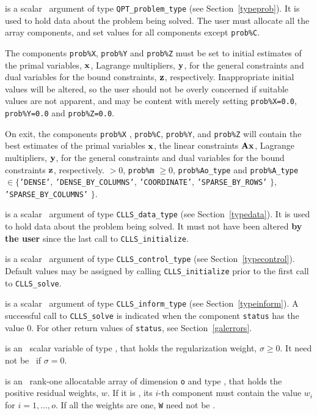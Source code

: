 \documentclass{galahad}
\newcommand{\packagename}{CLLS}
\begin{document}
\begin{description}
 is a scalar \intentinout\ argument of type
{\tt QPT\_problem\_type}
(see Section~\ref{typeprob}).
It is used to hold data about the problem being solved.
The user must allocate all the array components,
and set values for all components except {\tt prob\%C}.

The components {\tt prob\%X}, {\tt prob\%Y} and {\tt prob\%Z}
must be set to initial estimates of the primal variables, ${\mathbf{x}}$,
Lagrange multipliers, ${\mathbf{y}}$, for the general constraints
and dual variables for the bound constraints, ${\mathbf{z}}$, respectively.
Inappropriate initial values will be altered, so the user should
not be overly concerned if suitable values are not apparent, and may be
content with merely setting {\tt prob\%X=0.0}, {\tt prob\%Y=0.0}
and {\tt prob\%Z=0.0}.

On exit, the components {\tt prob\%X} , {\tt prob\%C}, {\tt prob\%Y},
and {\tt prob\%Z}
will contain the best estimates of the primal variables ${\mathbf{x}}$,
the linear constraints ${\mathbf{A}} {\mathbf{x}}$,
Lagrange multipliers, ${\mathbf{y}}$, for the general constraints
and dual variables for the bound constraints ${\mathbf{z}}$, respectively.
 $> 0$, {\tt prob\%m} $\geq 0$,
 {\tt prob\%Ao\_type} and {\tt prob\%A\_type} $\in \{${\tt 'DENSE'},
 {\tt 'DENSE\_BY\_COLUMNS'},
 {\tt 'COORDINATE'}, {\tt 'SPARSE\_BY\_\-ROWS'} $\}$,
 {\tt 'SPARSE\_BY\_\-COLUMNS'} $\}$.

 is a scalar \intentinout\ argument of type
{\tt \packagename\_data\_type}
(see Section~\ref{typedata}). It is used to hold data about the problem being
solved. It must not have been altered {\bf by the user} since the last call to
{\tt \packagename\_initialize}.

 is a scalar \intentin\ argument of type
{\tt \packagename\_control\_type}
(see Section~\ref{typecontrol}). Default values may be assigned by calling
{\tt \packagename\_initialize} prior to the first call to
{\tt \packagename\_solve}.

 is a scalar \intentinout\ argument of type
{\tt \packagename\_inform\_type}
(see Section~\ref{typeinform}).
A successful call to
{\tt \packagename\_solve}
is indicated when the  component {\tt status} has the value 0.
For other return values of {\tt status}, see Section~\ref{galerrors}.

 is an \optional\ scalar variable of type
\realdp, that holds the regularization weight, $\sigma \geq 0$.
It need not be \present\ if $\sigma = 0$.

 is an \optional\ rank-one allocatable array of dimension {\tt o} and
type \realdp, that holds the positive residual weights, $w$. If it
is \present, its $i$-th component must contain the value $w_{i}$ for
$i = 1, \ldots , o$.
If all the weights are one, {\tt W} need not be \present.

\end{description}
\end{document}
